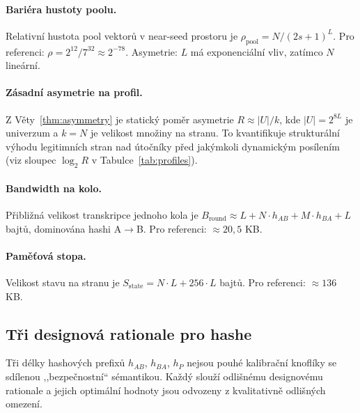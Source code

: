 \documentclass[11pt,a4paper]{article}
\begin{document}
\paragraph{Bariéra hustoty poolu.} Relativní hustota pool vektorů v near-seed prostoru je $\rho_\text{pool} = N / (2s+1)^L$. Pro referenci: $\rho = 2^{12}/7^{32} \approx 2^{-78}$. Asymetrie: $L$ má exponenciální vliv, zatímco $N$ lineární.

\paragraph{Zásadní asymetrie na profil.} Z Věty~\ref{thm:asymmetry} je statický poměr asymetrie $R \approx |U|/k$, kde $|U| = 2^{8L}$ je univerzum a $k = N$ je velikost množiny na stranu. To kvantifikuje strukturální výhodu legitimních stran nad útočníky před jakýmkoli dynamickým posílením (viz sloupec $\log_2 R$ v Tabulce~\ref{tab:profiles}).

\paragraph{Bandwidth na kolo.} Přibližná velikost transkripce jednoho kola je $B_\text{round} \approx L + N \cdot h_{AB} + M \cdot h_{BA} + L$ bajtů, dominována hashi A$\to$B. Pro referenci: $\approx 20{,}5$ KB.

\paragraph{Paměťová stopa.} Velikost stavu na stranu je $S_\text{state} = N \cdot L + 256 \cdot L$ bajtů. Pro referenci: $\approx 136$ KB.

\subsection{Tři designová rationale pro hashe}\label{sec:rationale}

Tři délky hashových prefixů $h_{AB}$, $h_{BA}$, $h_P$ nejsou pouhé kalibrační knoflíky se sdílenou ,,bezpečnostní`` sémantikou. Každý slouží odlišnému designovému rationale a jejich optimální hodnoty jsou odvozeny z kvalitativně odlišných omezení.
\end{document}
